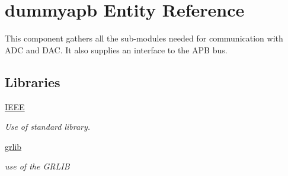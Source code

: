 \hypertarget{classdummyapb}{\section{dummyapb Entity Reference}
\label{classdummyapb}
}


This component gathers all the sub-\/modules needed for communication with A\-D\-C and D\-A\-C. It also supplies an interface to the A\-P\-B bus.  


\subsection*{Libraries}
 \begin{DoxyCompactItemize}
\item 
\hypertarget{classdummyapb_ae4f03c286607f3181e16b9aa12d0c6d4}{\hyperlink{classdummyapb_ae4f03c286607f3181e16b9aa12d0c6d4}{I\-E\-E\-E} }\label{classdummyapb_ae4f03c286607f3181e16b9aa12d0c6d4}

\begin{DoxyCompactList}\small\item\em Use of standard library. \end{DoxyCompactList}\item 
\hypertarget{classdummyapb_a2306e6b22fb33ca087d2f1b289b10e28}{\hyperlink{classdummyapb_a2306e6b22fb33ca087d2f1b289b10e28}{grlib} }\label{classdummyapb_a2306e6b22fb33ca087d2f1b289b10e28}

\begin{DoxyCompactList}\small\item\em use of the G\-R\-L\-I\-B \end{DoxyCompactList}\end{DoxyCompactItemize}
